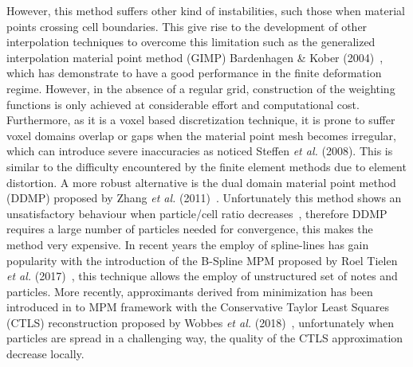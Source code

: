 However, this method suffers other kind of instabilities, such those
when material points crossing cell boundaries. This give rise to the
development of other interpolation techniques to overcome this
limitation such as the generalized interpolation material point method
(GIMP) Bardenhagen \& Kober (2004)~\cite{Bardenhagen2004}, which has
demonstrate to have a good performance in the finite deformation
regime. However, in the absence of a regular grid, construction of the
weighting functions is only achieved at considerable effort and
computational cost.  Furthermore, as it is  a voxel based
discretization technique, it is prone to suffer voxel domains overlap
or gaps when the material point mesh becomes irregular, which can
introduce severe inaccuracies as noticed Steffen {\it et al.}
(2008)\cite{Steffen2008}. This is similar to the difficulty
encountered by the finite element methods due to element distortion.
A more robust alternative is the dual domain material point method
(DDMP) proposed by Zhang {\it et al.}
(2011)~\cite{Zhang2011a}. Unfortunately this method shows an
unsatisfactory behaviour when particle/cell ratio
decreases~\cite{DHAKAL2016301}, therefore DDMP requires a large number
of particles needed for convergence, this
makes the method very expensive. In recent years the employ of
spline-lines has gain popularity with the introduction of the B-Spline
MPM proposed by Roel Tielen {\it et al.} (2017)~\cite{TIELEN2017265},
this technique allows the employ of unstructured set of notes and
particles. More recently, approximants derived from minimization has
been introduced in to MPM framework with the Conservative Taylor
Least Squares (CTLS) reconstruction proposed by Wobbes {\it et al.}
(2018)~\cite{E_Wobbes_2018}, unfortunately when particles are spread in
a challenging way, the quality of the CTLS approximation decrease
locally.


